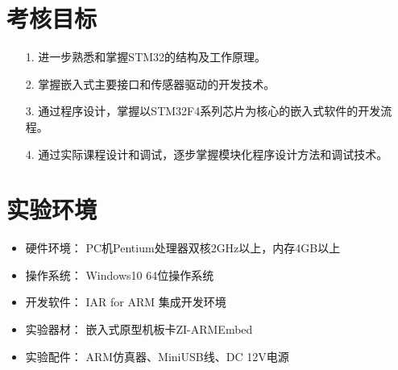 \section{考核目标}

\begin{itemize}
    \vspace{-6pt}
  \item[1.] 进一步熟悉和掌握STM32的结构及工作原理。
    \vspace{-6pt}
  \item[2.] 掌握嵌入式主要接口和传感器驱动的开发技术。
    \vspace{-6pt}
  \item[3.] 通过程序设计，掌握以STM32F4系列芯片为核心的嵌入式软件的开发流程。
    \vspace{-6pt}
  \item[4.] 通过实际课程设计和调试，逐步掌握模块化程序设计方法和调试技术。
\end{itemize}

\section{实验环境}

\begin{itemize}
    \vspace{-6pt}
  \item 硬件环境： PC机Pentium处理器双核2GHz以上，内存4GB以上
    \vspace{-6pt}
  \item 操作系统： Windows10 64位操作系统
    \vspace{-6pt}
  \item 开发软件： IAR for ARM 集成开发环境
    \vspace{-6pt}
  \item 实验器材： 嵌入式原型机板卡ZI-ARMEmbed
    \vspace{-6pt}
  \item 实验配件： ARM仿真器、MiniUSB线、DC 12V电源
\end{itemize}